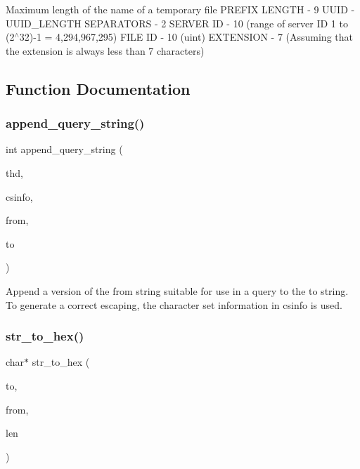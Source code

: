 Maximum length of the name of a temporary file P\+R\+E\+F\+IX L\+E\+N\+G\+TH -\/ 9 U\+U\+ID -\/ U\+U\+I\+D\+\_\+\+L\+E\+N\+G\+TH S\+E\+P\+A\+R\+A\+T\+O\+RS -\/ 2 S\+E\+R\+V\+ER ID -\/ 10 (range of server ID 1 to (2$^\wedge$32)-\/1 = 4,294,967,295) F\+I\+LE ID -\/ 10 (uint) E\+X\+T\+E\+N\+S\+I\+ON -\/ 7 (Assuming that the extension is always less than 7 characters) 

\subsection{Function Documentation}
\mbox{\label{group__Replication_ga634d01455adb6c184a8832558d9af0c2}} 
\subsubsection{\texorpdfstring{append\+\_\+query\+\_\+string()}{append\_query\_string()}}
{\footnotesize\ttfamily int append\+\_\+query\+\_\+string (\begin{DoxyParamCaption}\item[{T\+HD $\ast$}]{thd,  }\item[{const C\+H\+A\+R\+S\+E\+T\+\_\+\+I\+N\+FO $\ast$}]{csinfo,  }\item[{String const $\ast$}]{from,  }\item[{String $\ast$}]{to }\end{DoxyParamCaption})}

Append a version of the \textquotesingle{}from\textquotesingle{} string suitable for use in a query to the \textquotesingle{}to\textquotesingle{} string. To generate a correct escaping, the character set information in \textquotesingle{}csinfo\textquotesingle{} is used. \mbox{\label{group__Replication_gabd3a9658816041b32f7da3a121650668}} 
\subsubsection{\texorpdfstring{str\+\_\+to\+\_\+hex()}{str\_to\_hex()}}
{\footnotesize\ttfamily char$\ast$ str\+\_\+to\+\_\+hex (\begin{DoxyParamCaption}\item[{char $\ast$}]{to,  }\item[{const char $\ast$}]{from,  }\item[{size\+\_\+t}]{len }\end{DoxyParamCaption})}

